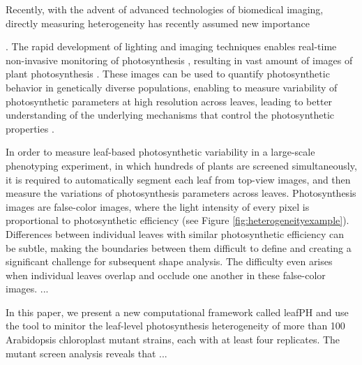 Recently, with the advent of advanced technologies of biomedical imaging, directly measuring heterogeneity has recently assumed new importance {\cite{cruz2014depi,tiihonen1996cerebral,wieneke1999non,wang2000}. The rapid development of lighting and imaging techniques enables real-time non-invasive monitoring of photosynthesis \cite{cruz2014depi,houle2010phenomics}, resulting in vast amount of images of plant photosynthesis \cite{wituszynska2013multivariable}. These images can be used to quantify photosynthetic behavior in genetically diverse populations, enabling to measure variability of photosynthetic parameters at high resolution across leaves, leading to better understanding of the underlying mechanisms that control the photosynthetic properties \cite{fiorani2013future,rascher2011non}.


In order to measure leaf-based photosynthetic variability in a large-scale phenotyping experiment, in which hundreds of plants are screened simultaneously, it is required to automatically segment each leaf from top-view images, and then measure the variations of photosynthesis parameters across leaves.
Photosynthesis images are false-color images, where the light intensity of every pixel is proportional to photosynthetic efficiency \cite{toet1996new} (see Figure \ref{fig:heterogeneityexample}). Differences between individual leaves with similar photosynthetic efficiency can be subtle, making the boundaries between them difficult to define and creating a significant challenge for subsequent shape analysis. The difficulty even arises when individual leaves overlap and occlude one another in these false-color images.
...


In this paper, we present a new computational framework called leafPH and use the tool to minitor the leaf-level photosynthesis heterogeneity of more than 100 Arabidopsis chloroplast mutant strains, each with at least four replicates. The mutant screen analysis reveals that ...



}
